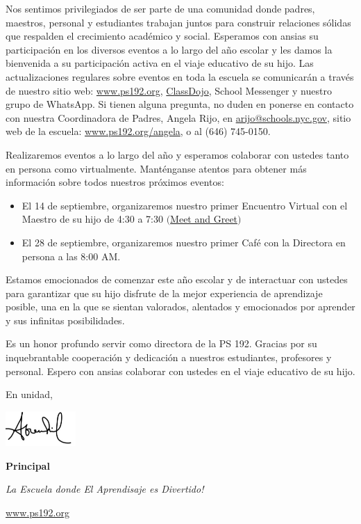 \documentclass[12pt,letterpaper]{article}
\begin{document}
Nos sentimos privilegiados de ser parte de una comunidad donde padres, maestros, personal
y estudiantes trabajan juntos para construir relaciones sólidas que respalden el
crecimiento académico y social. Esperamos con ansias su participación en los diversos
eventos a lo largo del año escolar y les damos la bienvenida a su participación activa en
el viaje educativo de su hijo.
\pagebreak
\vspace*{1.5cm}
Las actualizaciones regulares sobre eventos en toda la escuela se comunicarán a través de
nuestro sitio web: \url{www.ps192.org}, \href{https://www.classdojo.com/}{ClassDojo}, School Messenger y nuestro grupo de WhatsApp. Si tienen alguna pregunta, no duden en ponerse en contacto con nuestra Coordinadora de Padres, Angela Rijo, en
\url{arijo@schools.nyc.gov}, sitio web de la escuela: \url{www.ps192.org/angela}, o al (646) 745-0150.

Realizaremos eventos a lo largo del año y esperamos colaborar con ustedes tanto en persona como virtualmente. Manténganse atentos para obtener más información sobre todos nuestros próximos eventos:
	\begin{itemize}
	\item El 14 de septiembre, organizaremos nuestro primer Encuentro Virtual con el
	Maestro de su hijo de 4:30 a 7:30 $($\href{https://www.ps192.org/apps/pages/index.jsp?uREC_ID=1504975&type=d&pREC_ID=2510452&tota11y=true}{Meet and Greet}$)$
	\item El 28 de septiembre, organizaremos nuestro primer Café con la Directora en
	persona a las 8:00 AM.
	\end{itemize}
 
Estamos emocionados de comenzar este año escolar y de interactuar con ustedes para
garantizar que su hijo disfrute de la mejor experiencia de aprendizaje posible, una en la
que se sientan valorados, alentados y emocionados por aprender y sus infinitas 
posibilidades.

Es un honor profundo servir como directora de la PS 192. Gracias por su inquebrantable
cooperación y dedicación a nuestros estudiantes, profesores y personal. Espero con ansias
colaborar con ustedes en el viaje educativo de su hijo.

En unidad,

\includegraphics[width=0.2\textwidth]{hil_signature}

\textbf{Principal}

\textit{La Escuela donde El Aprendisaje es Divertido!}

\url{www.ps192.org}
\end{document}
